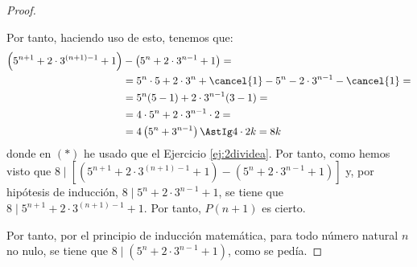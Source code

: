 \begin{ejercicio}
\begin{proof}
\begin{itemize}
                Por tanto, haciendo uso de esto, tenemos que:
                \begin{align*}
                    \left(5^{n+1} + 2\cdot 3^{(n+1)-1}+1\right) &- \left(5^n + 2\cdot 3^{n-1}+1\right) =\\
                    &= 5^n\cdot 5 + 2\cdot 3^{n}+\cancel{1} - 5^n - 2\cdot 3^{n-1} - \cancel{1} =\\
                    &= 5^n(5-1)+2\cdot 3^{n-1}(3-1) =\\
                    &= 4\cdot 5^n + 2\cdot 3^{n-1}\cdot 2 =\\
                    &= 4\left(5^n + 3^{n-1}\right)
                    \AstIg 4\cdot 2k = 8k
                \end{align*}
                donde en $(\ast)$ he usado que el Ejercicio \ref{ej:2dividea}.
                Por tanto, como hemos visto que $8\mid \left[\left(5^{n+1} + 2\cdot 3^{(n+1)-1}+1\right) - \left(5^n + 2\cdot 3^{n-1}+1\right)\right]$ y, por hipótesis de inducción, $8\mid 5^n + 2\cdot 3^{n-1}+1$, se tiene que $8\mid 5^{n+1} + 2\cdot 3^{(n+1)-1}+1$.
                Por tanto, $P(n+1)$ es cierto.
            \end{itemize}
            Por tanto, por el principio de inducción matemática, para todo número natural $n$ no nulo, se tiene que $8\mid \left(5^n + 2\cdot 3^{n-1}+1\right)$, como se pedía.
    \end{proof}
\end{ejercicio}

